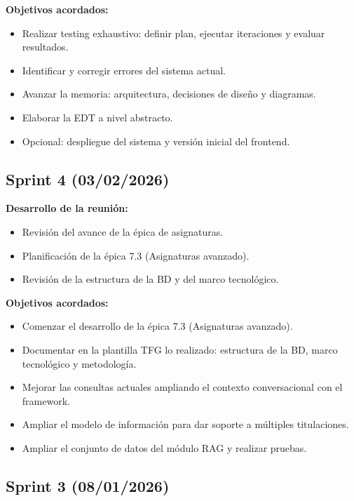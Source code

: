 \textbf{Objetivos acordados:}
\begin{itemize}
  \item Realizar testing exhaustivo: definir plan, ejecutar iteraciones y evaluar resultados.
  \item Identificar y corregir errores del sistema actual.
  \item Avanzar la memoria: arquitectura, decisiones de diseño y diagramas.
  \item Elaborar la EDT a nivel abstracto.
  \item Opcional: despliegue del sistema y versión inicial del frontend.
\end{itemize}

\subsection*{Sprint 4 (03/02/2026)}

\textbf{Desarrollo de la reunión:}
\begin{itemize}
  \item Revisión del avance de la épica de asignaturas.
  \item Planificación de la épica 7.3 (Asignaturas avanzado).
  \item Revisión de la estructura de la BD y del marco tecnológico.
\end{itemize}

\textbf{Objetivos acordados:}
\begin{itemize}
  \item Comenzar el desarrollo de la épica 7.3 (Asignaturas avanzado).
  \item Documentar en la plantilla TFG lo realizado: estructura de la BD, marco tecnológico y metodología.
  \item Mejorar las consultas actuales ampliando el contexto conversacional con el framework.
  \item Ampliar el modelo de información para dar soporte a múltiples titulaciones.
  \item Ampliar el conjunto de datos del módulo RAG y realizar pruebas.
\end{itemize}

\subsection*{Sprint 3 (08/01/2026)}

